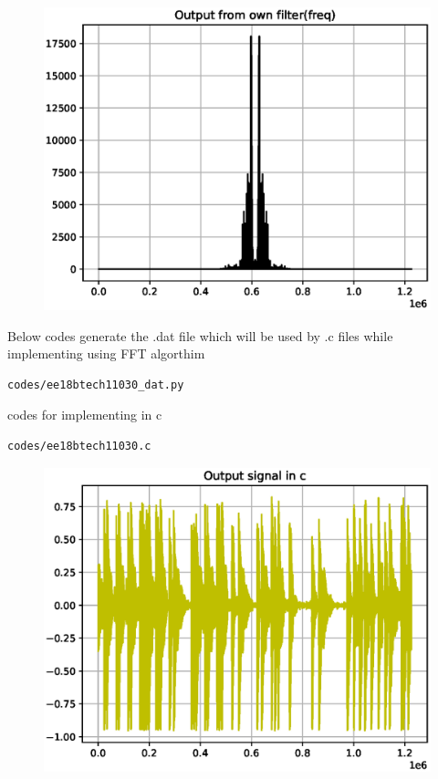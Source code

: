 \documentclass[journal,12pt,twocolumn]{IEEEtran}
\begin{document}
\begin{figure}[!ht]
\centering
\includegraphics[width=1\columnwidth,height=0.8\columnwidth]{./figs/ee18btech11030_3.eps}
\caption{}
\label{fig:ee18btech11030_3}
\end{figure}

Below codes generate the .dat file which will be used by .c files while implementing using FFT algorthim
\begin{lstlisting}
codes/ee18btech11030_dat.py
\end{lstlisting}
codes for implementing in c
\begin{lstlisting}
codes/ee18btech11030.c
\end{lstlisting}

\begin{figure}[!ht]
\centering
\includegraphics[width=1\columnwidth,height=0.8\columnwidth]{./figs/ee18btech11030_4.eps}
\caption{}
\label{fig:ee18btech11030_4}
\end{figure}
\end{document}
